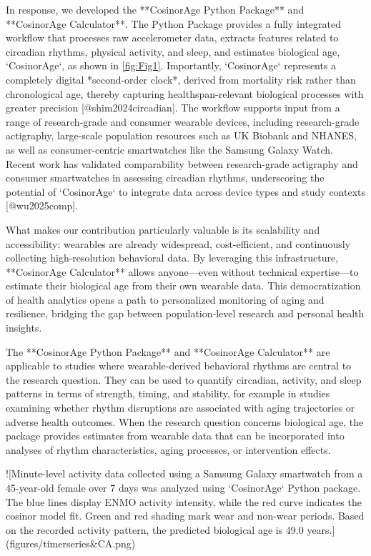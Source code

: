In response, we developed the **CosinorAge Python Package** and **CosinorAge Calculator**. The Python Package provides a fully integrated workflow that processes raw accelerometer data, extracts features related to circadian rhythms, physical activity, and sleep, and estimates biological age, `CosinorAge`, as shown in \autoref{fig:Fig1}. Importantly, `CosinorAge` represents a completely digital *second-order clock*, derived from mortality risk rather than chronological age, thereby capturing healthspan-relevant biological processes with greater precision [@shim2024circadian]. The workflow supports input from a range of research-grade and consumer wearable devices, including research-grade actigraphy, large-scale population resources such as UK Biobank and NHANES, as well as consumer-centric smartwatches like the Samsung Galaxy Watch. Recent work has validated comparability between research-grade actigraphy and consumer smartwatches in assessing circadian rhythms, underscoring the potential of `CosinorAge` to integrate data across device types and study contexts [@wu2025comp].  

What makes our contribution particularly valuable is its scalability and accessibility: wearables are already widespread, cost-efficient, and continuously collecting high-resolution behavioral data. By leveraging this infrastructure, **CosinorAge Calculator** allows anyone—even without technical expertise—to estimate their biological age from their own wearable data. This democratization of health analytics opens a path to personalized monitoring of aging and resilience, bridging the gap between population-level research and personal health insights.  

The **CosinorAge Python Package** and **CosinorAge Calculator** are applicable to studies where wearable-derived behavioral rhythms are central to the research question. They can be used to quantify circadian, activity, and sleep patterns in terms of strength, timing, and stability, for example in studies examining whether rhythm disruptions are associated with aging trajectories or adverse health outcomes. When the research question concerns biological age, the package provides estimates from wearable data that can be incorporated into analyses of rhythm characteristics, aging processes, or intervention effects.  

![Minute-level activity data collected using a Samsung Galaxy smartwatch from a 45-year-old female over 7 days was analyzed using `CosinorAge` Python package. The blue lines display ENMO activity intensity, while the red curve indicates the cosinor model fit. Green and red shading mark wear and non-wear periods. Based on the recorded activity pattern, the predicted biological age is 49.0 years.\label{fig:Fig1}](figures/timerseries&CA.png)

